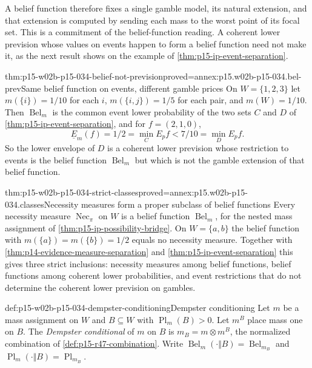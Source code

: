 A belief function therefore fixes a single gamble model, its natural
extension, and that extension is computed by sending each mass to the
worst point of its focal set. This is a commitment of the belief-function
reading. A coherent lower prevision whose values on events happen to form a
belief function need not make it, as the next result shows on the example of
\cref{thm:p15-ip-event-separation}.

\begin{hbcorollary}{thm:p15-w02b-p15-034-belief-not-prevision}{proved=annex:p15.w02b-p15-034.bel-prev}{Same belief function on events, different gamble prices}
On \(W=\{1,2,3\}\) let \(m(\{i\})=1/10\) for each \(i\),
\(m(\{i,j\})=1/5\) for each pair, and \(m(W)=1/10\). Then
\(\operatorname{Bel}_m\) is the common event lower probability of the two
sets \(C\) and \(D\) of \cref{thm:p15-ip-event-separation}, and for
\(f=(2,1,0)\),
\[
 \underline E_m(f)=1/2=\min_CE_pf<7/10=\min_DE_pf .
\]
So the lower envelope of \(D\) is a coherent lower prevision whose
restriction to events is the belief function \(\operatorname{Bel}_m\) but
which is not the gamble extension of that belief function.
\end{hbcorollary}

\begin{hbtheorem}{thm:p15-w02b-p15-034-strict-classes}{proved=annex:p15.w02b-p15-034.classes}{Necessity measures form a proper subclass of belief functions}
Every necessity measure \(\operatorname{Nec}_\pi\) on \(W\) is a belief
function \(\operatorname{Bel}_m\), for the nested mass assignment of
\cref{thm:p15-ip-possibility-bridge}. On \(W=\{a,b\}\) the belief function
with \(m(\{a\})=m(\{b\})=1/2\) equals no necessity measure.
Together with \cref{thm:p14-evidence-measure-separation} and
\cref{thm:p15-ip-event-separation} this gives three strict inclusions:
necessity measures among belief functions, belief functions among coherent
lower probabilities, and event restrictions that do not determine the
coherent lower prevision on gambles.
\end{hbtheorem}

\begin{hbdefinition}{def:p15-w02b-p15-034-dempster-conditioning}{Dempster conditioning}
Let \(m\) be a mass assignment on \(W\) and \(B\subseteq W\) with
\(\operatorname{Pl}_m(B)>0\). Let \(m^B\) place mass one on \(B\). The
\emph{Dempster conditional} of \(m\) on \(B\) is
\(m_B=m\otimes m^B\), the normalized combination of
\cref{def:p15-r47-combination}. Write
\(\operatorname{Bel}_m(\cdot\Vert B)=\operatorname{Bel}_{m_B}\) and
\(\operatorname{Pl}_m(\cdot\Vert B)=\operatorname{Pl}_{m_B}\).
\end{hbdefinition}

